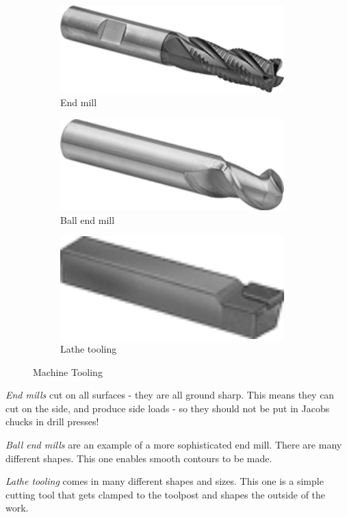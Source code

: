 \begin{figure}[H]
	\begin{subfigure}[b]{.19\linewidth}
		\includegraphics[width=0.95\textwidth]{imgs/endmill.png}
		\caption{End mill}
	\end{subfigure}	\begin{subfigure}[b]{.19\linewidth}
		\includegraphics[width=0.95\textwidth]{imgs/ball_endmill.png}
		\caption{Ball end mill}
	\end{subfigure}\begin{subfigure}[b]{.19\linewidth}
		\includegraphics[width=0.95\textwidth]{imgs/lathetool.png}
		\caption{Lathe tooling}
	\end{subfigure}	
	
	\caption{Machine Tooling}
\end{figure}

\begin{asparaenum}[a)]
 	\item \textit{End mills} cut on all surfaces - they are all ground sharp. This means they can cut on the side, and produce side loads - so they should not be put in Jacobs chucks in drill presses!
 	\item \textit{Ball end mills} are an example of a more sophisticated end mill. There are many different shapes. This one enables smooth contours to be made.
 	\item \textit{Lathe tooling} comes in many different shapes and sizes. This one is a simple cutting tool that gets clamped to the toolpost and shapes the outside of the work.
 \end{asparaenum}
 
